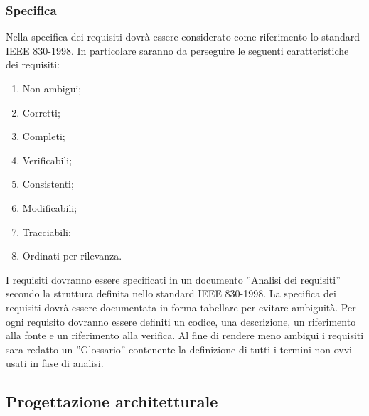{			\subsubsection{Specifica}{
				Nella specifica dei requisiti dovrà essere considerato come riferimento lo standard IEEE 830-1998. In particolare saranno da perseguire le seguenti caratteristiche dei requisiti:
				\begin{enumerate}
					\item Non ambigui;
					\item Corretti;
					\item Completi;
					\item Verificabili;
					\item Consistenti;
					\item Modificabili;
					\item Tracciabili;
					\item Ordinati per rilevanza.
				\end{enumerate}
				I requisiti dovranno essere specificati in un documento ”Analisi dei requisiti” secondo la struttura definita nello standard IEEE 830-1998. La specifica dei requisiti dovrà essere documentata in forma tabellare per evitare ambiguità. Per ogni requisito dovranno essere definiti un codice, una descrizione, un riferimento alla fonte e un riferimento alla verifica. Al fine di rendere meno ambigui i requisiti sara redatto un ”Glossario” contenente la definizione di tutti i termini non ovvi usati in fase di analisi.
			}

		}


   \subsection{Progettazione architetturale}

